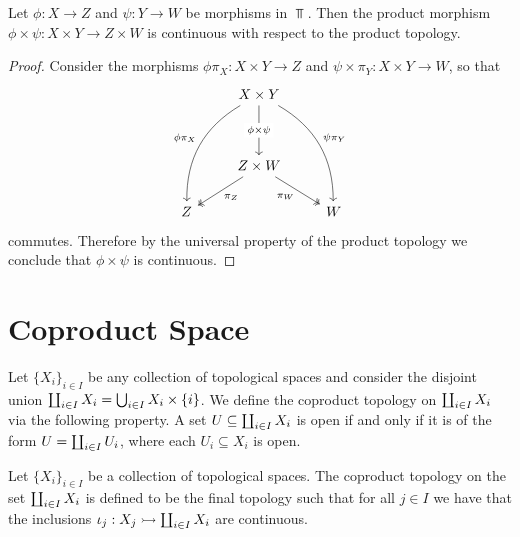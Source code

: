 \begin{proposition}
\label{prop:product-of-continuous-maps-is-continuous}
Let \(\phi: X \to Z\) and \(\psi: Y \to W\) be morphisms in \(\Top\). Then the
product morphism \(\phi \times \psi: X \times Y \to Z \times W\) is continuous
with respect to the product topology.
\end{proposition}

\begin{proof}
Consider the morphisms \(\phi \pi_X: X \times Y \to Z\) and
\(\psi \times \pi_Y: X \times Y \to W\), so that
\[
\begin{tikzcd}
&X \times Y \ar[dd, "\phi \times \psi" description]
\ar[ddld, "\phi \pi_X", bend right, swap]
\ar[ddrd, "\psi \pi_Y", bend left]
& \\
&&
\\
&Z \times W
\ar[rd, "\pi_W"', two heads]
\ar[ld, "\pi_Z", two heads]
& \\
Z & &W
\end{tikzcd}
\]
commutes. Therefore by the universal property of the product topology we
conclude that \(\phi \times \psi\) is continuous.
\end{proof}

\section{Coproduct Space}

\begin{definition}
  Let \(\{X_i\}_{i \in I}\) be any collection of topological spaces and consider
  the disjoint union \(\coprod_{i \in I} X_i = \bigcup_{i \in  I} X_i \times
  \{i\}\). We define the coproduct topology on \(\coprod_{i \in I} X_i\) via the
  following property. A set \(U \subseteq \coprod_{i \in I} X_i\) is open if and
  only if it is of the form \(U = \coprod_{i \in I} U_i\), where each \(U_i
  \subseteq X_i\) is open.
\end{definition}

\begin{definition}\label{def: coproduct top}
  Let \(\{X_i\}_{i \in I}\) be a collection of topological spaces. The coproduct
  topology on the set \(\coprod_{i \in I} X_i\) is defined to be the final
  topology such that for all \(j \in I\) we have that the inclusions \(\iota_j:
  X_j \rightarrowtail \coprod_{i \in I} X_i\) are continuous.
\end{definition}

